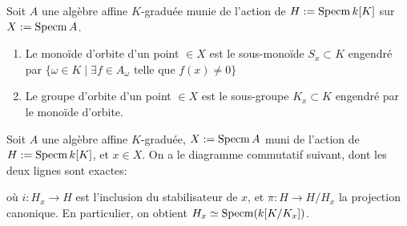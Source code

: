 \begin{defn}
Soit $A$ une algèbre affine $K$-graduée munie de l'action de $H:=\operatorname{Specm} k[K]$ sur $X:=\operatorname{Specm} A$.
\begin{enumerate}
\item Le monoïde d'orbite d'un point $\in X$ est le sous-monoïde $S_x\subset K$ engendré par $\lbrace\omega \in K\mid \exists f\in A_{\omega} \textrm{ telle que } f(x)\neq 0\rbrace$
\item Le groupe d'orbite d'un point $\in X$ est le sous-groupe $K_x\subset K$ engendré par le monoïde d'orbite.
\end{enumerate}
\end{defn}

\begin{prop}
Soit $A$ une algèbre affine $K$-graduée, $X:=\operatorname{Specm} A$ muni de l'action de $H:=\operatorname{Specm} k[K]$, et $x\in X$. On a le diagramme commutatif suivant, dont les deux lignes sont exactes:
	\begin{center}
	\end{center}
	où $i:H_x\rightarrow H$ est l'inclusion du stabilisateur de $x$, et $\pi:H\rightarrow H/H_x$ la projection canonique. En particulier, on obtient $H_x\simeq \operatorname{Specm}(k[K/K_x])$.
\end{prop}
